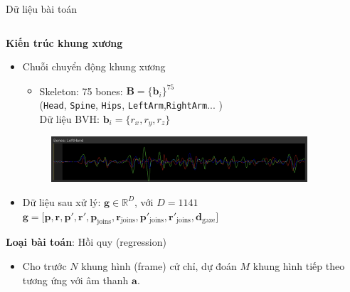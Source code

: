 \documentclass[10pt,mathserif]{beamer}
\begin{document}
\begin{frame}{Dữ liệu bài toán}
	
	
	\begin{columns}
		
		\begin{column}{0.7\textwidth}
			
			\textbf{Kiến trúc khung xương}
			\begin{itemize}
				\item Chuỗi chuyển động khung xương
				\begin{itemize}
					\item Skeleton: 75 bones: $\mathbf{B} = \{ \mathbf{b}_i \}^{75} $ \\
					\small{(\texttt{Head}, \texttt{Spine}, \texttt{Hips}, \texttt{LeftArm},\texttt{RightArm}... )} \\
					Dữ liệu BVH: $\mathbf{b}_{i} = \{r_x, r_y, r_z\}$
				\end{itemize}
				\begin{figure}[h]
					\centering
					\includegraphics[width=0.9\textwidth]{BoneRotationSeries}
				\end{figure}
				
				\item Dữ liệu sau xử lý: $\mathbf{g} \in \mathbb{R}^{D}$, với $D=1141$ 
				$\mathbf{g} = \Big[ \mathbf{p},  \mathbf{r},
				\mathbf{ p }',  \mathbf{r}',
				\mathbf{p}_{\text{joins}},  \mathbf{r}_{\text{joins}},
				\mathbf{p}'_{\text{joins}},  \mathbf{r}'_{\text{joins}},
				\mathbf{d}_{\text{gaze}}
				\Big]$
			\end{itemize}
			\vspace{10pt}
			\textbf{Loại bài toán}: Hồi quy (regression)
			\begin{itemize}
				\item Cho trước $N$ khung hình (frame) cử chỉ, dự đoán $M$ khung hình tiếp theo tương ứng với âm thanh $\mathbf{a}$.
			\end{itemize}
		
		\end{column}
		

\end{columns}
\end{frame}
\end{document}

